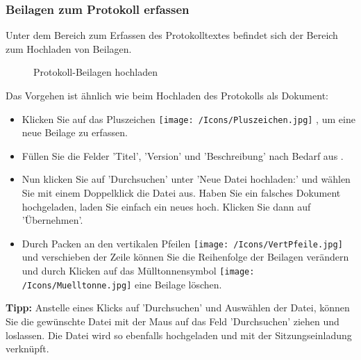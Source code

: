 \subsubsection{Beilagen zum Protokoll erfassen}

Unter dem Bereich zum Erfassen des Protokolltextes befindet sich der Bereich zum Hochladen von Beilagen.

\begin{figure}[H]
\caption{Protokoll-Beilagen hochladen}
\end{figure}

Das Vorgehen ist ähnlich wie beim Hochladen des Protokolls als Dokument:

\begin{itemize}
\item
Klicken Sie auf das Pluszeichen \texttt{[image: /Icons/Pluszeichen.jpg]} , um eine neue Beilage zu erfassen.
\item
Füllen Sie die Felder 'Titel', 'Version' und 'Beschreibung' nach Bedarf aus .
\item
Nun klicken Sie auf 'Durchsuchen'  unter 'Neue Datei hochladen:' und wählen Sie mit einem Doppelklick die Datei aus. Haben Sie ein falsches Dokument hochgeladen, laden Sie einfach ein neues hoch. Klicken Sie dann auf 'Übernehmen'.
\item
Durch Packen an den vertikalen Pfeilen \texttt{[image: /Icons/VertPfeile.jpg]}  und verschieben der Zeile können Sie die Reihenfolge der Beilagen verändern und durch Klicken auf das Mülltonnensymbol \texttt{[image: /Icons/Muelltonne.jpg]}  eine Beilage löschen.
\end{itemize}

\vspace{\baselineskip}

\textbf{Tipp:} Anstelle eines Klicks auf 'Durchsuchen' und Auswählen der Datei, können Sie die gewünschte Datei mit der Maus auf das Feld 'Durchsuchen' ziehen und loslassen. Die Datei wird so ebenfalls hochgeladen und mit der Sitzungseinladung verknüpft.

